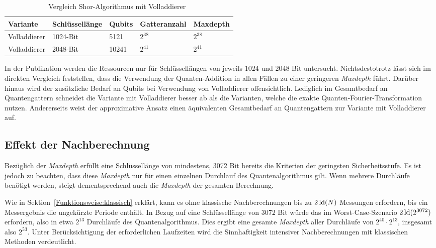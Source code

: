 \begin{table}[H]
    \centering
    \begin{tabular}{|l|l|l|l|l|}
        \hline
        \textbf{Variante} & \textbf{Schlüssellänge} & \textbf{Qubits} & \textbf{Gatteranzahl} & \textbf{Maxdepth} \\ \hline
        Volladdierer & 1024-Bit & 5121 & \(2^{38}\) & \(2^{38}\) \\ \hline
        Volladdierer & 2048-Bit & 10241 & \(2^{41}\) & \(2^{41}\) \\ \hline
    \end{tabular}
    \caption{Vergleich Shor-Algorithmus mit Volladdierer~\cite{cryptoeprint:2023/092}}
    \label{Volladdierer_Analyse}
\end{table}
In der Publikation werden die Ressourcen nur für Schlüssellängen von jeweils \(1024\) und \(2048\) Bit untersucht. 
Nichtsdestotrotz lässt sich im direkten Vergleich feststellen, 
dass die Verwendung der Quanten-Addition in allen Fällen zu einer geringeren \textit{Maxdepth} führt. 
Darüber hinaus wird der zusätzliche Bedarf an Qubits bei Verwendung von Volladdierer offensichtlich. 
Lediglich im Gesamtbedarf an Quantengattern schneidet die Variante mit Volladdierer besser ab als die Varianten, 
welche die exakte Quanten-Fourier-Transformation nutzen. 
Andererseits weist der approximative Ansatz einen äquivalenten Gesamtbedarf an Quantengattern zur Variante mit Volladdierer auf.

\subsection*{Effekt der Nachberechnung}

Bezüglich der \textit{Maxdepth} erfüllt eine Schlüssellänge von mindestens, 
3072 Bit bereits die Kriterien der geringsten Sicherheitsstufe. 
Es ist jedoch zu beachten, dass diese \textit{Maxdepth} nur für einen einzelnen Durchlauf des Quantenalgorithmus gilt. 
Wenn mehrere Durchläufe benötigt werden, steigt dementsprechend auch die \textit{Maxdepth} der gesamten Berechnung.

Wie in Sektion~\ref{Funktionsweise:klassisch} erklärt, kann es ohne klassische Nachberechnungen bis zu \(2\operatorname{ld}(N)\) Messungen erfordern, 
bis ein Messergebnis die ungekürzte Periode enthält. 
In Bezug auf eine Schlüssellänge von 3072 Bit würde das im Worst-Case-Szenario \(2\operatorname{ld}(2^{3072})\) erfordern, 
also in etwa \(2^{13}\) Durchläufe des Quantenalgorithmus.
Dies ergibt eine gesamte \textit{Maxdepth} aller Durchläufe von \(2^{40} \cdot 2^{13}\), insgesamt also \(2^{53}\).
Unter Berücksichtigung der erforderlichen Laufzeiten wird die Sinnhaftigkeit intensiver Nachberechnungen mit klassischen Methoden verdeutlicht.

